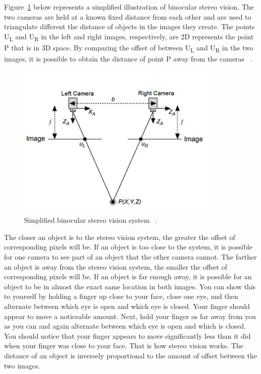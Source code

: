 Figure~\ref{fig:sv_diagram} below represents a simplified illustration of binocular stereo vision. The two cameras are held at a known fixed distance from each other and are used to triangulate different the distance of objects in the images they create. The points U\textsubscript{L} and U\textsubscript{R} in the left and right images, respectively, are 2D represents the point P that is in 3D space. By comparing the offset of between U\textsubscript{L} and U\textsubscript{R} in the two images, it is possible to obtain the distance of point P away from the cameras ~\cite{stereoVisionDiagram}.

\begin{figure}
\begin{center}
\includegraphics{figures/stereoVisionDiagram.jpg}
\captionfonts
\caption{Simplified binocular stereo vision system ~\cite{stereoVisionDiagram}.}
\label{fig:sv_diagram}
\end{center}
\end{figure}

The closer an object is to the stereo vision system, the greater the offset of corresponding pixels will be. If an object is too close to the system, it is possible for one camera to see part of an object that the other camera cannot. The farther an object is away from the stereo vision system, the smaller the offset of corresponding pixels will be. If an object is far enough away, it is possible for an object to be in almost the exact same location in both images. You can show this to yourself by holding a finger up close to your face, close one eye, and then alternate between which eye is open and which eye is closed. Your finger should appear to move a noticeable amount. Next, hold your finger as far away from you as you can and again alternate between which eye is open and which is closed. You should notice that your finger appears to move significantly less than it did when your finger was close to your face. That is how stereo vision works. The distance of an object is inversely proportional to the amount of offset between the two images.


